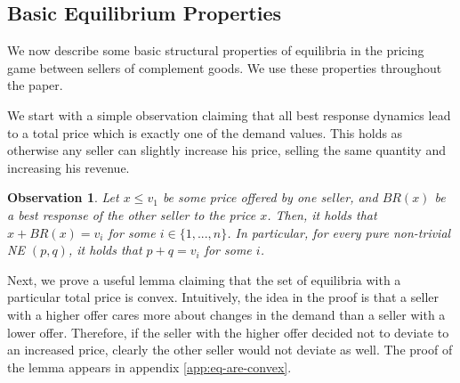 \documentclass[11pt,a4paper]{article}
\newtheorem{observation}[theorem]{Observation}
\begin{document}
%



\subsection{Basic Equilibrium Properties}

We now describe some basic structural properties of equilibria in the pricing game between sellers of complement goods. We use these properties throughout the paper.

We start with a simple observation claiming that all best response dynamics lead to a total price which is exactly one of the demand values.
This holds as otherwise any seller can slightly increase his price, selling the same quantity and increasing his revenue.

\begin{observation}
	\label{obs:BR-price-is-value}
	Let $x\leq v_1 $ be some price offered by one seller, and $BR(x)$ be a best response of the other seller to the price $x$. Then, it holds that $x+BR(x)=v_i$ for some $i\in \{1,...,n\}$.
	In particular, for every pure non-trivial NE $(p,q)$, it holds that $p+q=v_i$ for some $i$.
\end{observation}


Next, we prove a useful lemma claiming that the set of equilibria with a particular total price is convex.
Intuitively, the idea in the proof is that a seller with a higher offer cares more about changes in the demand than a seller with a lower offer. Therefore, if the seller with the higher offer decided not to deviate to an increased price, clearly the other seller would not deviate as well. The proof of the lemma appears in appendix \ref{app:eq-are-convex}.
	
\end{document}

